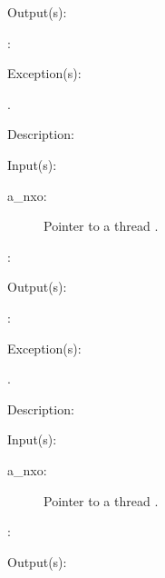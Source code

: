 \begin{capi}
\begin{capilist}
	\item[Output(s): ]
		\begin{description}\item[]
		\item[: ]
		\end{description}
	\item[Exception(s): ]
		\begin{description}\item[]
		\item[.]
		\end{description}
	\item[Description: ]
	\end{capilist}
\label{nxo_thread_}
	\begin{capilist}
	\item[Input(s): ]
		\begin{description}\item[]
		\item[a\_nxo: ]
			Pointer to a thread .
		\item[: ]
		\end{description}
	\item[Output(s): ]
		\begin{description}\item[]
		\item[: ]
		\end{description}
	\item[Exception(s): ]
		\begin{description}\item[]
		\item[.]
		\end{description}
	\item[Description: ]
	\end{capilist}
\label{nxo_thread_}
	\begin{capilist}
	\item[Input(s): ]
		\begin{description}\item[]
		\item[a\_nxo: ]
			Pointer to a thread \classname{nxo}.
		\item[: ]
		\end{description}
	\item[Output(s): ]
		\begin{description}\item[]

\end{description}
\end{capilist}
\end{capi}

